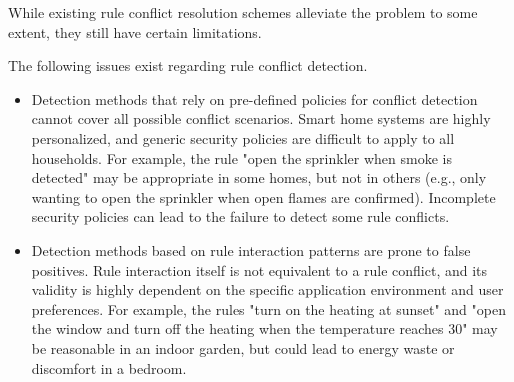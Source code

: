 While existing rule conflict resolution schemes alleviate the problem to some extent, they still have certain limitations.

The following issues exist regarding rule conflict detection.
\begin{itemize}
	\item Detection methods\cite{celik2018soteria,celik2019iotguard,ding2021iotsafe} that rely on pre-defined policies for conflict detection cannot cover all possible conflict scenarios. Smart home systems are highly personalized, and generic security policies are difficult to apply to all households. For example, the rule "open the sprinkler when smoke is detected" may be appropriate in some homes, but not in others (e.g., only wanting to open the sprinkler when open flames are confirmed). Incomplete security policies can lead to the failure to detect some rule conflicts.
	
	\item Detection methods\cite{chi2020cross,chi2023detecting,celik2019iotguard,alhanahnah2022iotcom} based on rule interaction patterns are prone to false positives. Rule interaction itself is not equivalent to a rule conflict, and its validity is highly dependent on the specific application environment and user preferences. For example, the rules "turn on the heating at sunset" and "open the window and turn off the heating when the temperature reaches 30\celsius" may be reasonable in an indoor garden, but could lead to energy waste or discomfort in a bedroom.
\end{itemize}

